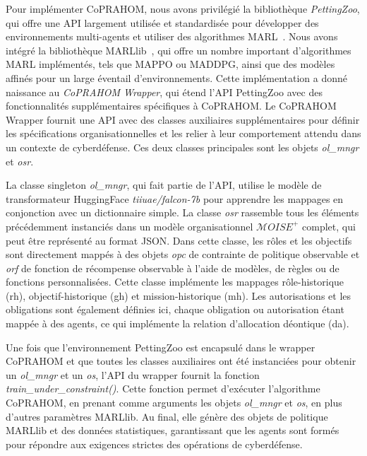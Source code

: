 Pour implémenter CoPRAHOM, nous avons privilégié la bibliothèque \emph{PettingZoo}, qui offre une API largement utilisée et standardisée pour développer des environnements multi-agents et utiliser des algorithmes MARL~\cite{Terry2021}. Nous avons intégré la bibliothèque MARLlib~\cite{hu2022marllib}, qui offre un nombre important d'algorithmes MARL implémentés, tels que MAPPO ou MADDPG, ainsi que des modèles affinés pour un large éventail d'environnements. Cette implémentation a donné naissance au \textit{CoPRAHOM Wrapper}, qui étend l'API PettingZoo avec des fonctionnalités supplémentaires spécifiques à CoPRAHOM.
%
Le CoPRAHOM Wrapper fournit une API avec des classes auxiliaires supplémentaires pour définir les spécifications organisationnelles et les relier à leur comportement attendu dans un contexte de cyberdéfense. Ces deux classes principales sont les objets \textit{ol\_mngr} et \textit{osr}.

La classe singleton \textit{ol\_mngr}, qui fait partie de l'API, utilise le modèle de transformateur HuggingFace \textit{tiiuae/falcon-7b} pour apprendre les mappages en conjonction avec un dictionnaire simple.
La classe \textit{osr} rassemble tous les éléments précédemment instanciés dans un modèle organisationnel $\mathcal{M}OISE^+$ complet, qui peut être représenté au format JSON. Dans cette classe, les rôles et les objectifs sont directement mappés à des objets \textit{opc} de contrainte de politique observable et \textit{orf} de fonction de récompense observable à l'aide de modèles, de règles ou de fonctions personnalisées. Cette classe implémente les mappages rôle-historique (rh), objectif-historique (gh) et mission-historique (mh). Les autorisations et les obligations sont également définies ici, chaque obligation ou autorisation étant mappée à des agents, ce qui implémente la relation d'allocation déontique (da).

Une fois que l'environnement PettingZoo est encapsulé dans le wrapper CoPRAHOM et que toutes les classes auxiliaires ont été instanciées pour obtenir un \textit{ol\_mngr} et un \textit{os}, l'API du wrapper fournit la fonction \textit{train\_under\_constraint()}. Cette fonction permet d'exécuter l'algorithme CoPRAHOM, en prenant comme arguments les objets \textit{ol\_mngr} et \textit{os}, en plus d'autres paramètres MARLlib. Au final, elle génère des objets de politique MARLlib et des données statistiques, garantissant que les agents sont formés pour répondre aux exigences strictes des opérations de cyberdéfense.


